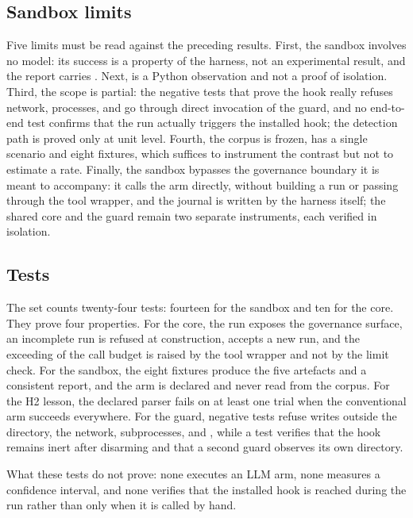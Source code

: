 \subsection{Sandbox limits}

Five limits must be read against the preceding results. First, the sandbox
involves no model: its success is a property of the harness, not an experimental
result, and the report carries . Next,
 is a Python observation and not a proof of isolation. Third,
the scope is partial: the negative tests that prove the hook really refuses
network, processes,  and  go through direct
invocation of the guard, and no end-to-end test confirms that the run actually
triggers the installed hook; the detection path is proved only at unit level.
Fourth, the corpus is frozen, has a single scenario and eight fixtures, which
suffices to instrument the contrast but not to estimate a rate. Finally, the
sandbox bypasses the governance boundary it is meant to accompany: it calls the
arm directly, without building a run or passing through the tool wrapper, and the
journal is written by the harness itself; the shared core and the guard remain two
separate instruments, each verified in isolation.

\subsection{Tests}

The set counts twenty-four tests: fourteen for the sandbox and ten for the core.
They prove four properties. For the core, the run exposes the governance surface,
an incomplete run is refused at construction, 
accepts a new run, and the exceeding of the call budget is raised by the tool
wrapper and not by the limit check. For the sandbox, the eight fixtures produce the
five artefacts and a consistent report, and the arm is declared and never read
from the corpus. For the H2 lesson, the declared parser fails on at least one trial
when the conventional arm succeeds everywhere. For the guard, negative tests
refuse writes outside the directory, the network, subprocesses,
 and , while a test verifies that the hook remains
inert after disarming and that a second guard observes its own directory.

What these tests do not prove: none executes an LLM arm, none measures a
confidence interval, and none verifies that the installed hook is reached during
the run rather than only when it is called by hand.
